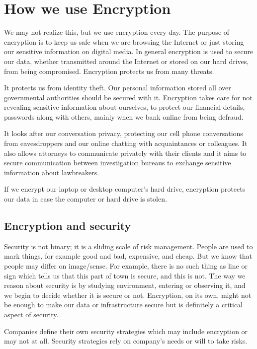 \chapter{How we use Encryption}\label{encryption}

We may not realize this, but we use encryption every day.
The purpose of encryption is to keep us safe when we are browsing the Internet or just storing our sensitive information on digital media.
In general encryption is used to secure our data, whether transmitted around the Internet or stored on our hard drives, from being compromised.
Encryption protects us from many threats.

It protects us from identity theft.
Our personal information stored all over governmental authorities should be secured with it.
Encryption takes care for not revealing sensitive information about ourselves, to protect our financial details, passwords along with others, mainly when we bank online from being defraud.

It looks after our conversation privacy, protecting our cell phone conversations from eavesdroppers and our online chatting with acquaintances or colleagues.
It also allows attorneys to communicate privately with their clients and it aims to secure communication between investigation bureaus to exchange sensitive information about lawbreakers.

If we encrypt our laptop or desktop computer's hard drive, encryption protects our data in case the computer or hard drive is stolen.



\section{Encryption and security}

Security is not binary; it is a sliding scale of risk management.
People are used to mark things, for example good and bad, expensive, and cheap.
But we know that people may differ on image/sense.
For example, there is no such thing as line or sign which tells us that this part of town is secure, and this is not.
The way we reason about security is by studying environment, entering or observing it, and we begin to decide whether it is secure or not.
Encryption, on its own, might not be enough to make our data or infrastructure secure but is definitely a critical aspect of security.

Companies define their own security strategies which may include encryption or may not at all.
Security strategies rely on company's needs or will to take risks.

